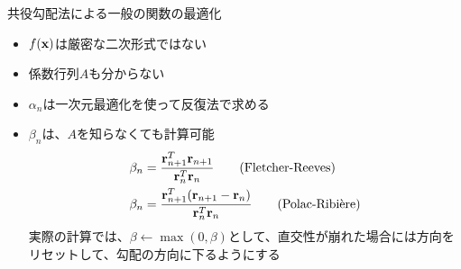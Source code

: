 \begin{frame}[t,fragile]{共役勾配法による一般の関数の最適化}
  \begin{itemize}
    \setlength{\itemsep}{1em}
  \item $f({\bf x})$は厳密な二次形式ではない
  \item 係数行列$A$も分からない
  \item $\alpha_n$は一次元最適化を使って反復法で求める
  \item $\beta_n$は、$A$を知らなくても計算可能
    \begin{align*}
      \beta_n &= \frac{{\bf r}_{n+1}^T {\bf r}_{n+1}}{{\bf r}_n^T {\bf r}_n} \qquad \text{(Fletcher-Reeves)} \\
      \beta_n &= \frac{{\bf r}_{n+1}^T ({\bf r}_{n+1}-{\bf r}_{n})}{{\bf r}_n^T {\bf r}_n} \qquad \text{(Polac-Ribi\`ere)}
    \end{align*}
    実際の計算では、$\beta \leftarrow \max(0,\beta)$として、直交性が崩れた場合には方向をリセットして、勾配の方向に下るようにする
  \end{itemize}
\end{frame}
